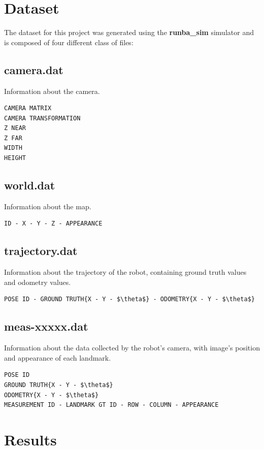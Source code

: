 \documentclass{article}
\begin{document}
\section{Dataset}
The dataset for this project was generated using the \textbf{runba\_sim} simulator \cite{runba_sim} and is composed of four different class of files:

\subsection{camera.dat}
Information about the camera.
\begin{lstlisting}[mathescape=true]
CAMERA MATRIX
CAMERA TRANSFORMATION
Z NEAR
Z FAR
WIDTH
HEIGHT
\end{lstlisting}

\subsection{world.dat}
Information about the map.
\begin{lstlisting}[mathescape=true]
ID - X - Y - Z - APPEARANCE
\end{lstlisting}

\subsection{trajectory.dat}
Information about the trajectory of the robot, containing ground truth values and odometry values.
\begin{lstlisting}[mathescape=true]
POSE ID - GROUND TRUTH{X - Y - $\theta$} - ODOMETRY{X - Y - $\theta$}
\end{lstlisting}

\subsection{meas-xxxxx.dat}
Information about the data collected by the robot's camera, with image's position and appearance of each landmark.
\begin{lstlisting}[mathescape=true]
POSE ID
GROUND TRUTH{X - Y - $\theta$}
ODOMETRY{X - Y - $\theta$}
MEASUREMENT ID - LANDMARK GT ID - ROW - COLUMN - APPEARANCE
\end{lstlisting}

\section{Results}
\end{document}
